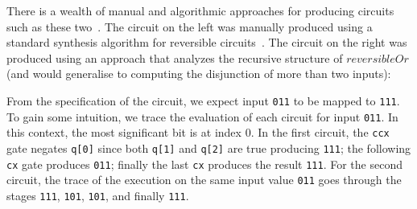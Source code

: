 There is a wealth of manual and algorithmic approaches for producing circuits such as these
two~\cite{maslov:2003:rls:1087512,1201583}. The circuit on the left was manually produced using a standard synthesis
algorithm for reversible circuits~\cite{10.1145/775832.775915}. The circuit on the right was produced using an approach
that analyzes the recursive structure of $\mathit{reversibleOr}$ (and would generalise to computing the disjunction of
more than two inputs):

From the specification of the circuit, we expect input \verb|011| to be mapped
to \verb|111|. To gain some intuition, we trace the evaluation of each circuit for
input \verb|011|. In this context, the most significant bit is at index 0. In
the first circuit, the \verb|ccx| gate negates \verb|q[0]| since both \verb|q[1]| and
\verb|q[2]| are true producing \verb|111|; the following \verb|cx| gate produces
\verb|011|; finally the last \verb|cx| produces the result \verb|111|. For the
second circuit, the trace of the execution on the same input value \verb|011| goes through the stages \verb|111|, \verb|101|, \verb|101|, and finally \verb|111|.


